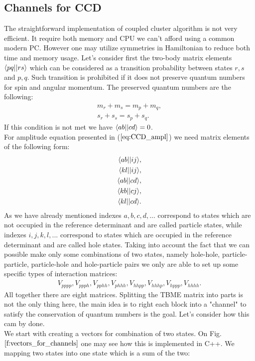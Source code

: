 \documentclass[twoside,english]{uiofysmaster}
\theoremstyle{definition}
\begin{document}
\subsection{Channels for CCD}
The straightforward implementation of coupled cluster algorithm is not very efficient. It require both memory and CPU we can't afford using a common modern PC. However one may utilize symmetries in Hamiltonian to reduce both time and memory usage. Let's consider first the two-body matrix elements $\braket{pq||rs}$ which can be considered as a transition probability between states $r,s$ and $p,q$. Such transition is prohibited if it does not preserve quantum numbers for spin and angular momentum. The preserved quantum numbers are the following:
\begin{align}
m_r + m_s = m_p + m_q,\\
s_r + s_s = s_p + s_q.
\end{align}
If this condition is not met we have $\braket{ab||cd} = 0$.\\
For amplitude equation presented in ($\ref{eq:CCD_ampl}$) we need matrix elements of the following form:
\begin{align}\label{eq:TBME_channels}
\braket{ab||ij}&,\\
\braket{kl||ij}&,\\
\braket{ab||cd}&,\\
\braket{kb||cj}&,\\
\braket{kl||cd}&.\\
\end{align}
As we have already mentioned indexes $a,b,c,d,...$ correspond to states which are not occupied in the reference determinant and are called particle states, while  indexes $i,j,k,l,...$ correspond to states which are occupied in the reference determinant and are called hole states. Taking into account the fact that we can possible make only some combinations of two states, namely hole-hole, particle-particle, particle-hole and hole-particle pairs we only are able to set up some  specific types of interaction matrices:
\begin{align}
V_{pppp},V_{ppph}, V_{pphh}, V_{phhh},V_{hhpp},V_{hhhp},V_{hppp},V_{hhhh}.
\end{align}
All together there are eight matrices. Splitting the TBME matrix into parts is not the only thing here, the main idea is to right each block into a "channel" to satisfy the conservation of quantum numbers is the goal. Let's consider how this cam by done.\\
We start with creating a vectors for combination of two states. On Fig. $\ref{f:vectors_for_channels}$ one may see how this is implemented in C++. We mapping two states into one state which is a sum of the two:
\end{document}
